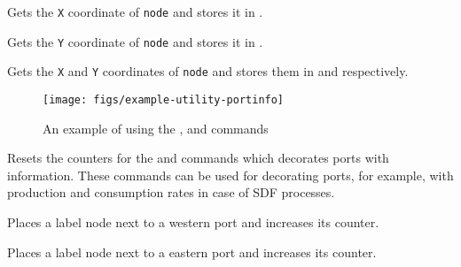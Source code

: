 {\hspace{1pt}

\noindent Gets the \texttt{X} coordinate of \texttt{node} and stores it in \texttt{\string\xmacro}.

\hspace{1pt}

\noindent Gets the \texttt{Y} coordinate of \texttt{node} and stores it in \texttt{\string\ymacro}.

\hspace{1pt}

\noindent Gets the \texttt{X} and \texttt{Y} coordinates of \texttt{node} and stores them in \texttt{\string\xmacro} and  \texttt{\string\ymacro} respectively.

\begin{figure}[htb]\centering
\texttt{[image: figs/example-utility-portinfo]}

\caption{An example of using the \texttt{\string\resetportinfo}, \texttt{\string\epinfo} and \texttt{\string\wpinfo} commands}
\end{figure}
\hspace{1pt}

\noindent Resets the counters for the \texttt{\string\epinfo} and \texttt{\string\wpinfo} commands which decorates ports with information. These commands can be used for decorating ports, for example, with production and consumption rates in case of SDF processes.

\hspace{1pt}

\noindent Places a label node next to a western port and increases its counter.

\hspace{1pt}

\noindent Places a label node next to a eastern port and increases its counter.

}
